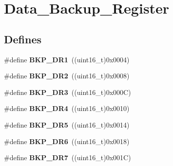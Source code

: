 \hypertarget{group__Data__Backup__Register}{
\section{Data\_\-Backup\_\-Register}
\label{group__Data__Backup__Register}
}
\subsection*{Defines}
\begin{DoxyCompactItemize}
\item 
\hypertarget{group__Data__Backup__Register_ga5d4c3eeaccafcfc0ee3b5dc01381bab0}{
\#define {\bfseries BKP\_\-DR1}~((uint16\_\-t)0x0004)}
\label{group__Data__Backup__Register_ga5d4c3eeaccafcfc0ee3b5dc01381bab0}

\item 
\hypertarget{group__Data__Backup__Register_ga73867f10a3ef17eeb0d3ace641f185ad}{
\#define {\bfseries BKP\_\-DR2}~((uint16\_\-t)0x0008)}
\label{group__Data__Backup__Register_ga73867f10a3ef17eeb0d3ace641f185ad}

\item 
\hypertarget{group__Data__Backup__Register_gadcc77540e016c6e8dffab223af35ae88}{
\#define {\bfseries BKP\_\-DR3}~((uint16\_\-t)0x000C)}
\label{group__Data__Backup__Register_gadcc77540e016c6e8dffab223af35ae88}

\item 
\hypertarget{group__Data__Backup__Register_gab327f2365ef58f3163f7fe8fa7b3c56e}{
\#define {\bfseries BKP\_\-DR4}~((uint16\_\-t)0x0010)}
\label{group__Data__Backup__Register_gab327f2365ef58f3163f7fe8fa7b3c56e}

\item 
\hypertarget{group__Data__Backup__Register_ga21191497b79eb37ab00a1564e060e5ca}{
\#define {\bfseries BKP\_\-DR5}~((uint16\_\-t)0x0014)}
\label{group__Data__Backup__Register_ga21191497b79eb37ab00a1564e060e5ca}

\item 
\hypertarget{group__Data__Backup__Register_ga9d84a78d9c99d57844cfc557f4c047b4}{
\#define {\bfseries BKP\_\-DR6}~((uint16\_\-t)0x0018)}
\label{group__Data__Backup__Register_ga9d84a78d9c99d57844cfc557f4c047b4}

\item 
\hypertarget{group__Data__Backup__Register_gaed1b548c12929fbfbc57548ec1316df0}{
\#define {\bfseries BKP\_\-DR7}~((uint16\_\-t)0x001C)}
\label{group__Data__Backup__Register_gaed1b548c12929fbfbc57548ec1316df0}


\end{DoxyCompactItemize}

